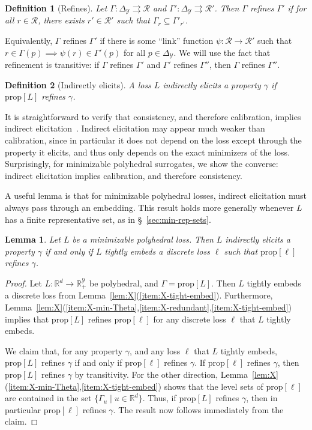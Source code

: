 \documentclass[11pt]{article}
\newcommand{\reals}{\mathbb{R}}
\newcommand{\prop}[1]{\mathrm{prop}[#1]}
\newcommand{\simplex}{\Delta_\Y}
\newcommand{\R}{\mathcal{R}}
\newcommand{\Y}{\mathcal{Y}}
\newcommand{\toto}{\rightrightarrows}
\newtheorem{lemma}{Lemma}
\newtheorem{definition}{Definition}
\begin{document}
\begin{definition}[Refines]
	Let $\Gamma:\simplex \toto \R$ and $\Gamma':\simplex\toto \R'$.
	Then $\Gamma$ \emph{refines} $\Gamma'$ if for all $r \in \R$, there exists $r' \in \R'$ such that $\Gamma_{r} \subseteq \Gamma'_{r'}$.
\end{definition}
Equivalently, $\Gamma$ refines $\Gamma'$ if there is some ``link'' function $\psi:\R\to\R'$ such that $r\in\Gamma(p) \implies \psi(r) \in \Gamma'(p)$ for all $p\in\simplex$.
We will use the fact that refinement is transitive: if $\Gamma$ refines $\Gamma'$ and $\Gamma'$ refines $\Gamma''$, then $\Gamma$ refines $\Gamma''$.

\begin{definition}[Indirectly elicits]
  A loss $L$ \emph{indirectly elicits} a property $\gamma$ if $\prop L$ refines $\gamma$.
\end{definition}

It is straightforward to verify that consistency, and therefore calibration, implies indirect elicitation~\citep{finocchiaro2021unifying,agarwal2015consistent,steinwart2008support}.
Indirect elicitation may appear much weaker than calibration, since in particular it does not depend on the loss except through the property it elicits, and thus only depends on the exact minimizers of the loss.
Surprisingly, for minimizable polyhedral surrogates, we show the converse: indirect elicitation implies calibration, and therefore consistency.

A useful lemma is that for minimizable polyhedral losses, indirect elicitation must always pass through an embedding.
This result holds more generally whenever $L$ has a finite representative set, as in \S~\ref{sec:min-rep-sets}.
\begin{lemma}\label{lem:ie-iff-embeds-refinement}
  Let $L$ be a minimizable polyhedral loss.
  Then $L$ indirectly elicits a property $\gamma$ if and only if $L$ tightly embeds a discrete loss $\ell$ such that $\prop \ell$ refines $\gamma$.
\end{lemma}
\begin{proof}
  Let $L:\reals^d\to\reals^\Y_+$ be polyhedral, and $\Gamma = \prop L$.
  Then $L$ tightly embeds a discrete loss from Lemma~\ref{lem:X}(\ref{item:X-tight-embed}).
  Furthermore, Lemma~\ref{lem:X}(\ref{item:X-min-Theta},\ref{item:X-redundant},\ref{item:X-tight-embed}) implies that $\prop L$ refines $\prop \ell$ for any discrete loss $\ell$ that $L$ tightly embeds.

  We claim that, for any property $\gamma$, and any loss $\ell$ that $L$ tightly embeds, $\prop L$ refines $\gamma$ if and only if $\prop \ell$ refines $\gamma$.
  If $\prop \ell$ refines $\gamma$, then $\prop L$ refines $\gamma$ by transitivity.
  For the other direction, Lemma~\ref{lem:X}(\ref{item:X-min-Theta},\ref{item:X-tight-embed}) shows that the level sets of $\prop \ell$ are contained in the set $\{\Gamma_u \mid u\in\reals^d\}$.
  Thus, if $\prop L$ refines $\gamma$, then in particular $\prop \ell$ refines $\gamma$.
  The result now follows immediately from the claim.
\end{proof}
\end{document}
